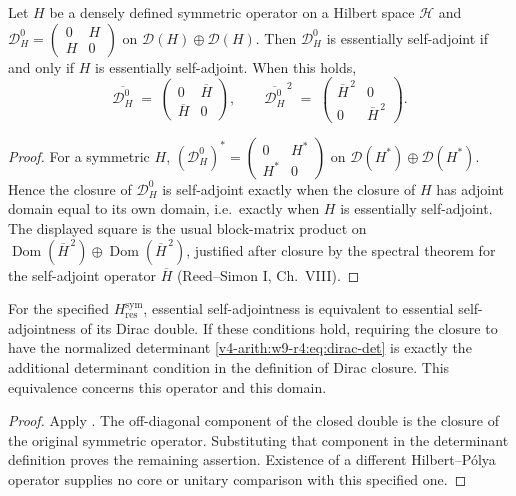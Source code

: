 \begin{lemma}
\label{v4-arith:w9-r4:lem:dirac-double-detects-sa}
\ClaimStatusProvedHere Let \(H\) be a densely defined symmetric
operator on a Hilbert space \(\mathcal{H}\) and
\(\mathscr{D}_{H}^{0}=
\left(\begin{smallmatrix}0&H\\H&0\end{smallmatrix}\right)\)
on \(\mathcal{D}(H)\oplus\mathcal{D}(H)\). Then
\(\mathscr{D}_{H}^{0}\) is essentially self-adjoint if and only if
\(H\) is essentially self-adjoint. When this holds,
\[
\overline{\mathscr{D}_{H}^{0}}
\;=\;
\begin{pmatrix}
0 & \overline{H}\\
\overline{H} & 0
\end{pmatrix},
\qquad
\overline{\mathscr{D}_{H}^{0}}^{\,2}
\;=\;
\begin{pmatrix}
\overline{H}^{\,2} & 0\\
0 & \overline{H}^{\,2}
\end{pmatrix}.
\]
\end{lemma}

\begin{proof}
For a symmetric \(H\),
\((\mathscr{D}_{H}^{0})^{*}=
\left(\begin{smallmatrix}0&H^{*}\\H^{*}&0\end{smallmatrix}\right)\) on
\(\mathcal{D}(H^{*})\oplus\mathcal{D}(H^{*})\). Hence the closure of
\(\mathscr{D}_{H}^{0}\) is self-adjoint exactly when the closure of
\(H\) has adjoint domain equal to its own domain, i.e.\ exactly when
\(H\) is essentially self-adjoint. The displayed square is the usual
block-matrix product on
\(\operatorname{Dom}(\overline H^{\,2})
 \oplus\operatorname{Dom}(\overline H^{\,2})\), justified after
closure by the spectral theorem for the self-adjoint operator
\(\overline{H}\) (Reed--Simon I, Ch.~VIII).
\end{proof}

\begin{theorem}
\label{v4-arith:w9-r4:thm:polyakov-dirac-normal-form}
For the specified \(H_{\mathrm{res}}^{\mathrm{sym}}\), essential
self-adjointness is equivalent to essential self-adjointness of
its Dirac double. If these conditions hold, requiring the closure
to have the normalized determinant
\eqref{v4-arith:w9-r4:eq:dirac-det} is exactly the additional
determinant condition in the definition of Dirac closure.
This equivalence concerns this operator and this domain.
\end{theorem}
\begin{proof}
Apply .
The off-diagonal component of the closed double is the closure
of the original symmetric operator. Substituting that component
in the determinant definition proves the remaining assertion.
Existence of a different Hilbert--P\'olya operator supplies no
core or unitary comparison with this specified one.
\end{proof}

